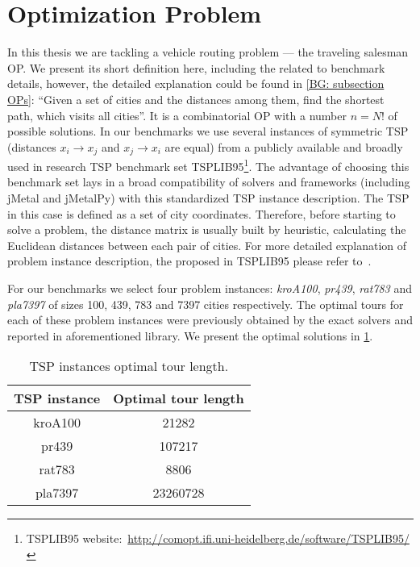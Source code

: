 \section{Optimization Problem}\label{eval: op}
In this thesis we are tackling a vehicle routing problem --- the traveling salesman OP. We present its short definition here, including the related to benchmark details, however, the detailed explanation could be found in \cref{BG: subsection OPs}: ``Given a set of cities and the distances among them, find the shortest path, which visits all cities''. It is a combinatorial OP with a number $n = N!$ of possible solutions. In our benchmarks we use several instances of symmetric TSP (distances $x_i \rightarrow x_j$ and $x_j \rightarrow x_i$ are equal) from a publicly available and broadly used in research TSP benchmark set TSPLIB95\footnote{TSPLIB95 website:~\url{http://comopt.ifi.uni-heidelberg.de/software/TSPLIB95/}}. The advantage of choosing this benchmark set lays in a broad compatibility of solvers and frameworks (including jMetal and jMetalPy) with this standardized TSP instance description. The TSP in this case is defined as a set of city coordinates. Therefore, before starting to solve a problem, the distance matrix is usually built by heuristic, calculating the Euclidean distances between each pair of cities. For more detailed explanation of problem instance description, the proposed in TSPLIB95 please refer to~\cite{reinelt1995tsplib95}.

For our benchmarks we select four problem instances: \emph{kroA100}, \emph{pr439}, \emph{rat783} and \emph{pla7397} of sizes 100, 439, 783 and 7397 cities respectively. The optimal tours for each of these problem instances were previously obtained by the exact solvers and reported in aforementioned library. We present the optimal solutions in \cref{eval:table:tsp optimal tour length}.

\begin{table}[h!]
	\centering
	\begin{tabular}{cc}
		\rowcolor{gray!10}
		\hline
		\textbf{TSP instance} & \textbf{Optimal tour length} \\
		\hline
		kroA100 & 21282 \\
		pr439 & 107217 \\
		rat783 & 8806 \\
		pla7397 & 23260728 \\
		\hline
	\end{tabular}
	\caption{TSP instances optimal tour length.}
	\label{eval:table:tsp optimal tour length}
\end{table}


